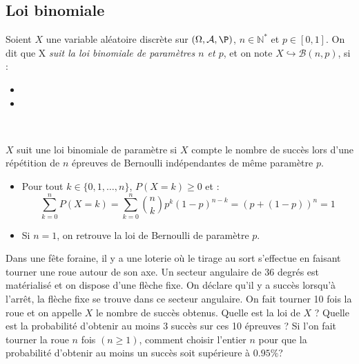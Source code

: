 \documentclass[french,11pt,twoside]{VcCours}
\begin{document}
\subsection{Loi binomiale}
%
\begin{Proposition}{}
Soient $X$ une variable aléatoire discrète sur $(\Omega, \mathcal{A},\P)$, $n \in \mathbb{N}^*$ et $p \in [0,1]$. On dit que X \emph{suit la loi binomiale de paramètres $n$ et $p$}, et on note $X \hookrightarrow \mathcal{B}(n,p)$, si :
\begin{itemize}
 \item {}
 \item {}
\end{itemize}
$\phantom{}$
\end{Proposition}

\begin{Remarque}{} $X$ suit une loi binomiale de paramètre si $X$ compte le nombre de succès lors d'une répétition de $n$ épreuves de Bernoulli indépendantes de même paramètre $p$.
\end{Remarque}

\begin{Remarques}{}
\begin{itemize} 
\item Pour tout $k \in  \{0,1,\ldots,n\}$, $P(X=k) \geq 0$ et :
$$ \sum_{k=0}^n P(X=k) = \sum_{k=0}^n\binom nk p^k(1-p)^{n-k} = (p+(1-p))^n=1$$
\item Si $n=1$, on retrouve la loi de Bernoulli de paramètre $p$.
\end{itemize}
\end{Remarques}

\begin{ApplicationDirecte}{} Dans une fête foraine, il y a une loterie où le tirage au sort s'effectue en faisant tourner une roue autour de son axe. Un secteur angulaire de 36 degrés est matérialisé et on dispose d'une flèche fixe. On déclare qu'il y a succès lorsqu'à l'arrêt, la flèche fixe se trouve dans ce secteur angulaire. On fait tourner 10 fois la roue et on appelle $X$ le nombre de succès obtenus. Quelle est la loi de $X$ ? Quelle est la probabilité d'obtenir au moins 3 succès sur ces 10 épreuves ? Si l'on fait tourner la roue $n$ fois $(n \geq 1)$, comment choisir l'entier $n$ pour que la probabilité d'obtenir au moins un succès soit supérieure à $0.95 \%$?
\end{ApplicationDirecte} 
\end{document}

